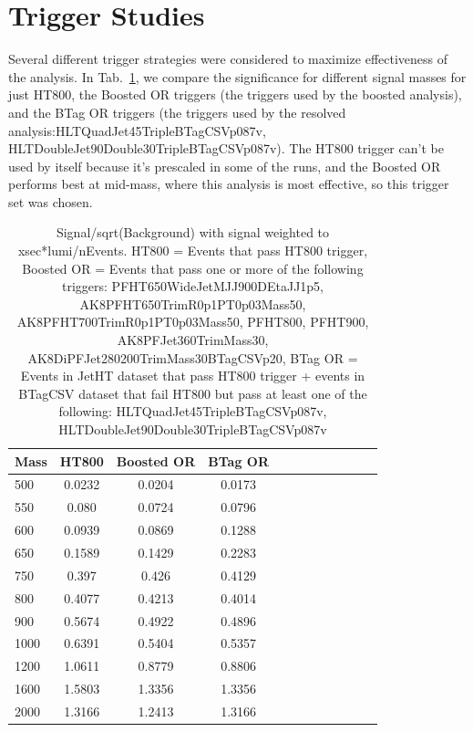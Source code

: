 \section{Trigger Studies\label{app:trigger}}

Several different trigger strategies were considered to maximize effectiveness of the analysis. In Tab.~\ref{tab:trigopt}, we compare the significance for different signal masses for just HT800, the Boosted OR triggers (the triggers used by the boosted analysis), and the BTag OR triggers (the triggers used by the resolved analysis:HLTQuadJet45TripleBTagCSVp087v, HLTDoubleJet90Double30TripleBTagCSVp087v). The HT800 trigger can't be used by itself because it's prescaled in some of the runs, and the Boosted OR performs best at mid-mass, where this analysis is most effective, so this trigger set was chosen.

\begin{table}[h]
\begin{tabular}{|l|c|c|c|c|c|c|c|c|c|c|c|}
\hline
Mass & HT800 & Boosted OR & BTag OR \\ \hline
500 & 0.0232 & 0.0204 & 0.0173\\
550 & 0.080 & 0.0724 & 0.0796\\
600 & 0.0939 & 0.0869 & 0.1288\\
650 & 0.1589 & 0.1429 & 0.2283\\
750 & 0.397 & 0.426 & 0.4129\\
800 & 0.4077 & 0.4213& 0.4014\\
900 & 0.5674 & 0.4922 & 0.4896\\
1000 & 0.6391 & 0.5404 & 0.5357\\
1200 & 1.0611 & 0.8779 & 0.8806\\
1600 & 1.5803 & 1.3356 & 1.3356\\
2000 &1.3166 & 1.2413 & 1.3166\\\hline
\end{tabular}
\caption{Signal/sqrt(Background) with signal weighted to xsec*lumi/nEvents. HT800 = Events that pass HT800 trigger, Boosted OR = Events that pass one or more of the following triggers:  PFHT650WideJetMJJ900DEtaJJ1p5, AK8PFHT650TrimR0p1PT0p03Mass50, AK8PFHT700TrimR0p1PT0p03Mass50, PFHT800, PFHT900, AK8PFJet360TrimMass30, AK8DiPFJet280200TrimMass30BTagCSVp20, BTag OR = Events in JetHT dataset that pass HT800 trigger + events in BTagCSV dataset that fail HT800 but pass at least one of the following: HLTQuadJet45TripleBTagCSVp087v, HLTDoubleJet90Double30TripleBTagCSVp087v}\label{tab:trigopt}
\end{table}

